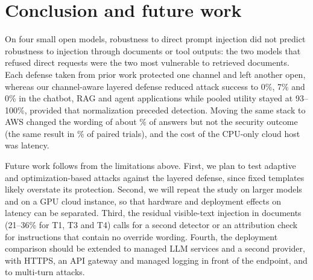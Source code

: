 \documentclass[a4paper,fleqn]{cas-dc}
\begin{document}
\section{Conclusion and future work}\label{sec:conclusion}
On four small open models, robustness to direct prompt injection did not predict robustness to injection through documents or tool outputs: the two models that refused direct requests were the two most vulnerable to retrieved documents.
Each defense taken from prior work protected one channel and left another open, whereas our channel-aware layered defense reduced attack success to 0\%, 7\% and 0\% in the chatbot, RAG and agent applications while pooled utility stayed at 93--100\%, provided that normalization preceded detection.
Moving the same stack to AWS changed the wording of about \cloudDiffPct\% of answers but not the security outcome (the same result in \cloudAgreePct\% of paired trials), and the cost of the CPU-only cloud host was latency.

Future work follows from the limitations above.
First, we plan to test adaptive and optimization-based attacks against the layered defense, since fixed templates likely overstate its protection.
Second, we will repeat the study on larger models and on a GPU cloud instance, so that hardware and deployment effects on latency can be separated.
Third, the residual visible-text injection in documents (21--36\% for T1, T3 and T4) calls for a second detector or an attribution check for instructions that contain no override wording.
Fourth, the deployment comparison should be extended to managed LLM services and a second provider, with HTTPS, an API gateway and managed logging in front of the endpoint, and to multi-turn attacks.




\end{document}

